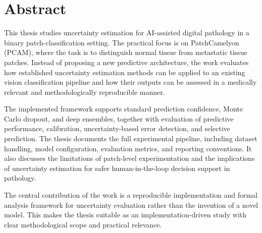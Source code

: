 \chapter*{Abstract}

This thesis studies uncertainty estimation for AI-assisted digital pathology in a binary patch-classification setting. The practical focus is on PatchCamelyon (PCAM), where the task is to distinguish normal tissue from metastatic tissue patches. Instead of proposing a new predictive architecture, the work evaluates how established uncertainty estimation methods can be applied to an existing vision classification pipeline and how their outputs can be assessed in a medically relevant and methodologically reproducible manner.

The implemented framework supports standard prediction confidence, Monte Carlo dropout, and deep ensembles, together with evaluation of predictive performance, calibration, uncertainty-based error detection, and selective prediction. The thesis documents the full experimental pipeline, including dataset handling, model configuration, evaluation metrics, and reporting conventions. It also discusses the limitations of patch-level experimentation and the implications of uncertainty estimation for safer human-in-the-loop decision support in pathology.

The central contribution of the work is a reproducible implementation and formal analysis framework for uncertainty evaluation rather than the invention of a novel model. This makes the thesis suitable as an implementation-driven study with clear methodological scope and practical relevance.
